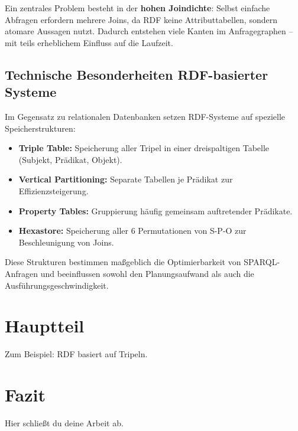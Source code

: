 \documentclass[12pt]{article}
\begin{document}
Ein zentrales Problem besteht in der \textbf{hohen Joindichte}: Selbst einfache Abfragen erfordern mehrere Joins, da RDF keine Attributtabellen, sondern atomare Aussagen nutzt. Dadurch entstehen viele Kanten im Anfragegraphen – mit teils erheblichem Einfluss auf die Laufzeit.

\subsection{Technische Besonderheiten RDF-basierter Systeme}

Im Gegensatz zu relationalen Datenbanken setzen RDF-Systeme auf spezielle Speicherstrukturen:
\begin{itemize}
    \item \textbf{Triple Table:} Speicherung aller Tripel in einer dreispaltigen Tabelle (Subjekt, Prädikat, Objekt).
    \item \textbf{Vertical Partitioning:} Separate Tabellen je Prädikat zur Effizienzsteigerung.
    \item \textbf{Property Tables:} Gruppierung häufig gemeinsam auftretender Prädikate.
    \item \textbf{Hexastore:} Speicherung aller 6 Permutationen von S-P-O zur Beschleunigung von Joins.
\end{itemize}

Diese Strukturen bestimmen maßgeblich die Optimierbarkeit von SPARQL-Anfragen und beeinflussen sowohl den Planungsaufwand als auch die Ausführungsgeschwindigkeit.


\section{Hauptteil}
Zum Beispiel: RDF basiert auf Tripeln.

\section{Fazit}
Hier schließt du deine Arbeit ab.

\printbibliography
\end{document}
